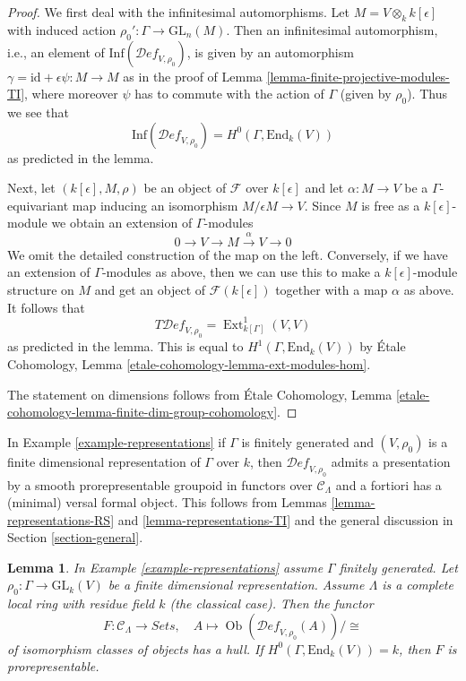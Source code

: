 \documentclass{stacks-project}
\theoremstyle{plain}
\newtheorem{lemma}[subsection]{Lemma}
\theoremstyle{definition}
\theoremstyle{remark}
\numberwithin{equation}{subsection}
\def\Ext{\mathop{\mathrm{Ext}}\nolimits}
\def\Ob{\mathop{\mathrm{Ob}}\nolimits}
\def\Deformationcategory{\mathcal{D}\!\mathit{ef}}
\begin{document}
\begin{proof}
We first deal with the infinitesimal automorphisms.
Let $M = V \otimes_k k[\epsilon]$ with induced action
$\rho_0' : \Gamma \to \text{GL}_n(M)$.
Then an infinitesimal automorphism, i.e., an element of
$\text{Inf}(\Deformationcategory_{V, \rho_0})$,
is given by an automorphism
$\gamma = \text{id} + \epsilon \psi : M \to M$
as in the proof of Lemma \ref{lemma-finite-projective-modules-TI},
where moreover $\psi$ has to commute
with the action of $\Gamma$ (given by $\rho_0$).
Thus we see that
$$
\text{Inf}(\Deformationcategory_{V, \rho_0}) = H^0(\Gamma, \text{End}_k(V))
$$
as predicted in the lemma.

\medskip\noindent
Next, let $(k[\epsilon], M, \rho)$ be an object of $\mathcal{F}$
over $k[\epsilon]$ and let $\alpha : M \to V$ be a $\Gamma$-equivariant map
inducing an isomorphism $M/\epsilon M \to V$.
Since $M$ is free as a $k[\epsilon]$-module we obtain
an extension of $\Gamma$-modules
$$
0 \to V \to M \xrightarrow{\alpha} V \to 0
$$
We omit the detailed construction of the map on the left.
Conversely, if we have an extension of $\Gamma$-modules as
above, then we can use this to make a $k[\epsilon]$-module
structure on $M$ and get an object of $\mathcal{F}(k[\epsilon])$
together with a map $\alpha$ as above.
It follows that
$$
T\Deformationcategory_{V, \rho_0} = \Ext^1_{k[\Gamma]}(V, V)
$$
as predicted in the lemma. This is equal to
$H^1(\Gamma, \text{End}_k(V))$ by
\'Etale Cohomology, Lemma \ref{etale-cohomology-lemma-ext-modules-hom}.

\medskip\noindent
The statement on dimensions follows from
\'Etale Cohomology, Lemma
\ref{etale-cohomology-lemma-finite-dim-group-cohomology}.
\end{proof}

\noindent
In Example \ref{example-representations} if $\Gamma$ is finitely generated
and $(V, \rho_0)$ is a finite dimensional representation of $\Gamma$
over $k$, then $\Deformationcategory_{V, \rho_0}$
admits a presentation by a smooth prorepresentable groupoid in functors
over $\mathcal{C}_\Lambda$
and a fortiori has a (minimal) versal formal object. This follows
from Lemmas \ref{lemma-representations-RS} and \ref{lemma-representations-TI}
and the general discussion in Section \ref{section-general}.

\begin{lemma}
\label{lemma-representations-hull}
In Example \ref{example-representations} assume $\Gamma$ finitely generated.
Let $\rho_0 : \Gamma \to \text{GL}_k(V)$ be a finite dimensional representation.
Assume $\Lambda$ is a complete local ring with residue field $k$
(the classical case). Then the functor
$$
F : \mathcal{C}_\Lambda \longrightarrow \textit{Sets},\quad
A \longmapsto \Ob(\Deformationcategory_{V, \rho_0}(A))/\cong
$$
of isomorphism classes of objects has a hull. If
$H^0(\Gamma, \text{End}_k(V)) = k$, then $F$ is
prorepresentable.
\end{lemma}
\end{document}
